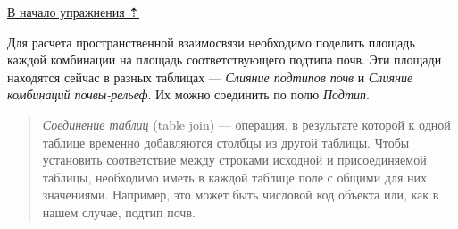 \documentclass[12pt,]{book}
\begin{document}
\protect\hyperlink{overlay}{В начало упражнения ⇡}

Для расчета пространственной взаимосвязи необходимо поделить площадь каждой комбинации на площадь соответствующего подтипа почв. Эти площади находятся сейчас в разных таблицах --- \emph{Слияние подтипов почв} и \emph{Слияние комбинаций почвы-рельеф}. Их можно соединить по полю \emph{Подтип}.

\begin{quote}
\emph{Соединение таблиц} (table join) --- операция, в результате которой к одной таблице временно добавляются столбцы из другой таблицы. Чтобы установить соответствие между строками исходной и присоединяемой таблицы, необходимо иметь в каждой таблице поле с общими для них значениями. Например, это может быть числовой код объекта или, как в нашем случае, подтип почв.
\end{quote}
\end{document}
